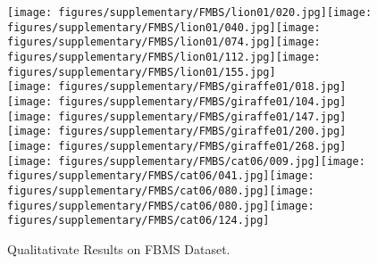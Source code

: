 \documentclass{bmvc2k_arxiv}
\begin{document}
 \begin{figure}[h]
\centering
\texttt{[image: figures/supplementary/FMBS/lion01/020.jpg]}\hspace{1px}\texttt{[image: figures/supplementary/FMBS/lion01/040.jpg]}\hspace{1px}\texttt{[image: figures/supplementary/FMBS/lion01/074.jpg]}\hspace{1px}\texttt{[image: figures/supplementary/FMBS/lion01/112.jpg]}\hspace{1px}\texttt{[image: figures/supplementary/FMBS/lion01/155.jpg]}\\
\texttt{[image: figures/supplementary/FMBS/giraffe01/018.jpg]}\hspace{1px}\texttt{[image: figures/supplementary/FMBS/giraffe01/104.jpg]}\hspace{1px}
  \texttt{[image: figures/supplementary/FMBS/giraffe01/147.jpg]}\hspace{1px}\texttt{[image: figures/supplementary/FMBS/giraffe01/200.jpg]}\hspace{1px}\texttt{[image: figures/supplementary/FMBS/giraffe01/268.jpg]}\\
\texttt{[image: figures/supplementary/FMBS/cat06/009.jpg]}\hspace{1px}\texttt{[image: figures/supplementary/FMBS/cat06/041.jpg]}\hspace{1px}\texttt{[image: figures/supplementary/FMBS/cat06/080.jpg]}\hspace{1px}\texttt{[image: figures/supplementary/FMBS/cat06/080.jpg]}\hspace{1px}\texttt{[image: figures/supplementary/FMBS/cat06/124.jpg]}\\
  \caption{Qualitativate Results on FBMS Dataset.}
  \end{figure}
 \vspace{-15pt}
\end{document}
